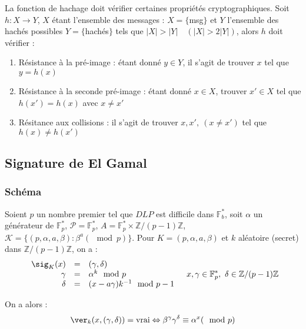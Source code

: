 \documentclass[a4paper, 10pt]{thesis}
\begin{document}
La fonction de hachage doit vérifier certaines propriétés cryptographiques. Soit $h : X
\longrightarrow Y$, $X$ étant l'ensemble des messages : $X = \{$msg$\}$ et $Y$ l'ensemble des hachés
possibles $Y = \{$hachés$\}$ tels que $|X| > |Y|\quad (|X| > 2|Y|)$, alors $h$ doit vérifier :
\begin{enumerate}
    \item Résistance à la pré-image : étant donné $y \in Y$, il s'agit de trouver $x$ tel que $y =
        h(x)$
    \item Résistance à la seconde pré-image : étant donné $x \in X$, trouver $x' \in X$ tel que
        $h(x') = h(x)$ avec $x \neq x'$
    \item Résitance aux collisions : il s'agit de trouver $x, x', \ (x \neq x')$ tel que $h(x) \neq
        h(x')$
\end{enumerate}

\subsection{Signature de El Gamal}

\subsubsection{Schéma}

Soient $p$ un nombre premier tel que $DLP$ est difficile dans $\mathbb{F}_b^*$, soit $\alpha$ un
générateur de $\mathbb{F}_p^*$, $\mathcal{P} =\mathbb{F}_p^*$, $A = \mathbb{F}_p^* \times
\mathbb{Z}/(p-1)\mathbb{Z}$, $\mathcal{K} = \{(p, \alpha, a, \beta) : \beta^a (\mod p)\}$. Pour $K =
(p, \alpha, a, \beta)$ et $k$ aléatoire (secret) dans $\mathbb{Z}/(p-1)\mathbb{Z}$, on a :
\begin{displaymath}
    \begin{array}{rcl}
        \sig_K(x) & = & (\gamma, \delta) \\
        \gamma & = & \alpha^k \mod p \\
        \delta & = & (x - a \gamma)k^{-1} \mod p-1
    \end{array}
    \quad x, \gamma \in \mathbb{F}_p^*, \ \delta \in \mathbb{Z}/(p-1)\mathbb{Z}
\end{displaymath}

On a alors :
\begin{displaymath}
    \ver_k(x, (\gamma, \delta)) = \mbox{vrai} \Leftrightarrow \beta^{\gamma} \gamma^{\delta} \equiv \alpha^x (\mod p)
\end{displaymath}
\end{document}
